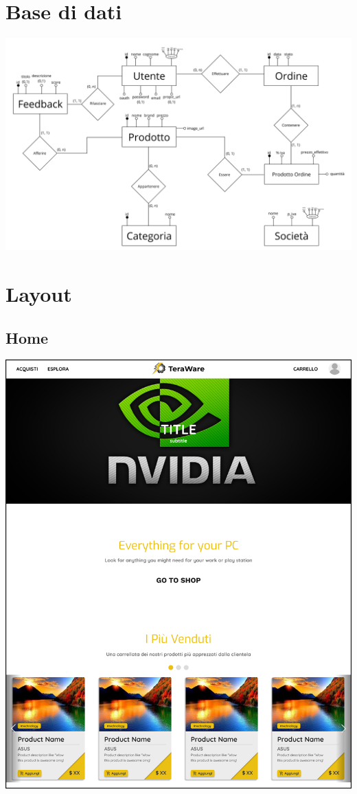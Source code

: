 \documentclass{article}
\begin{document}
\begin{large}
    \section{Base di dati}
        \begin{center}
        \includegraphics[scale=0.4]{teraware/er.png}
        \end{center}
    \section{Layout}
        \subsection{Home}
            \begin{center}
                \includegraphics[scale=0.29]{teraware/_layouthome.png}
            \end{center}

\end{large}
\end{document}

